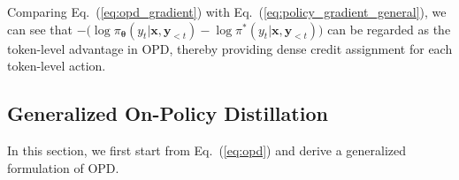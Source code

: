 \documentclass{article} %
\begin{document}
Comparing Eq.~(\ref{eq:opd_gradient}) with Eq.~(\ref{eq:policy_gradient_general}), we can see that $-\big(\log \pi_{\boldsymbol{\theta}}(y_t| \boldsymbol{x}, \boldsymbol{y}_{<t} ) - \log \pi^{*}(y_t| \boldsymbol{x}, \boldsymbol{y}_{<t} )\big)$ can be regarded as the token-level advantage in OPD, thereby providing dense credit assignment for each token-level action. 

\subsection{Generalized On-Policy Distillation}
In this section, we first start from Eq.~(\ref{eq:opd}) and derive a generalized formulation of OPD. 
\end{document}
